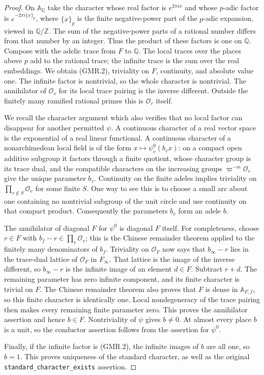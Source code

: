 \documentclass[11pt,a4paper]{article}
\numberwithin{equation}{section}
\theoremstyle{remark}\newtheorem{remark}[theorem]{Remark}
\begin{document}
\begin{proof}
On $\mathbb A_{\mathbb Q}$ take the character whose real factor is
$e^{2\pi ix}$ and whose $p$-adic factor is
$e^{-2\pi i\{x\}_p}$, where $\{x\}_p$ is the finite negative-power
part of the $p$-adic expansion, viewed in $\mathbb Q/\mathbb Z$.
The sum of the negative-power parts of a rational number differs from
that number by an integer.  Thus the product of these factors is one
on $\mathbb Q$.  Compose with the adelic trace from $F$ to $\mathbb Q$.
The local traces over the places above $p$ add to the rational trace;
the infinite trace is the sum over the real embeddings.  We obtain
(GMR.2), triviality on $F$, continuity, and absolute value one.
The infinite factor is nontrivial, so the whole character is nontrivial.
The annihilator of $\mathcal O_v$ for its local trace pairing is the
inverse different.  Outside the finitely many ramified rational primes
this is $\mathcal O_v$ itself.

We recall the character argument which also verifies that no local
factor can disappear for another permitted $\psi$.  A continuous
character of a real vector space is the exponential of a real linear
functional.  A continuous character of a nonarchimedean local field is
of the form $x\mapsto\psi^0_v(b_vx)$: on a compact open additive subgroup
it factors through a finite quotient, whose character group is its
trace dual, and the compatible characters on the increasing groups
$\varpi^{-m}\mathcal O_v$ give the unique parameter $b_v$.
Continuity on the finite adeles implies triviality on
$\prod_{v\notin S}\mathcal O_v$ for some finite $S$.  One way to see
this is to choose a small arc about one containing no nontrivial
subgroup of the unit circle and use continuity on that compact product.
Consequently the parameters $b_v$ form an adele $b$.

The annihilator of diagonal $F$ for $\psi^0$ is diagonal $F$ itself.
For completeness, choose $r\in F$ with $b_f-r\in\prod_v\mathcal O_v$;
this is the Chinese remainder theorem applied to the finitely many
denominators of $b_f$.  Triviality on $\mathcal O_F$ now says that
$b_\infty-r$ lies in the trace-dual lattice of $\mathcal O_F$ in
$F_\infty$.  That lattice is the image of the inverse different, so
$b_\infty-r$ is the infinite image of an element $d\in F$.
Subtract $r+d$.  The remaining parameter has zero infinite component,
and its finite character is trivial on $F$.  The Chinese remainder
theorem also proves that $F$ is dense in $\mathbb A_{F,f}$, so this finite
character is identically one.  Local nondegeneracy of the trace pairing
then makes every remaining finite parameter zero.  This proves the
annihilator assertion and hence $b\in F$.  Nontriviality of $\psi$ gives
$b\ne0$.  At almost every place $b$ is a unit, so the conductor assertion
follows from the assertion for $\psi^0$.

Finally, if the infinite factor is (GMR.2), the infinite images of $b$
are all one, so $b=1$.  This proves uniqueness of the standard
character, as well as the original \texttt{standard\_\allowbreak character\_\allowbreak exists}
assertion.
\end{proof}
\end{document}
